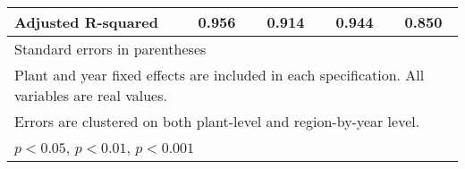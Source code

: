 \begin{table}[htbp]
\begin{tabular}{l*{4}{c}}
Adjusted R-squared&    0.956         &    0.914         &    0.944         &    0.850         \\
\bottomrule
\multicolumn{5}{l}{\footnotesize Standard errors in parentheses}\\
\multicolumn{5}{l}{\footnotesize Plant and year fixed effects are included in each specification. All variables are real values.}\\
\multicolumn{5}{l}{\footnotesize Errors are clustered on both plant-level and region-by-year level. }\\
\multicolumn{5}{l}{\footnotesize \sym{*} \(p<0.05\), \sym{**} \(p<0.01\), \sym{***} \(p<0.001\)}\\
\end{tabular}
\end{table}
